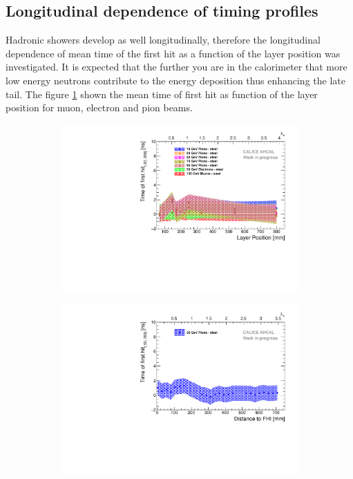 \subsection{Longitudinal dependence of timing profiles}

Hadronic showers develop as well longitudinally, therefore the longitudinal dependence of mean time of the first hit as a function of the layer position was investigated. It is expected that the further you are in the calorimeter that more low energy neutrons contribute to the energy deposition thus enhancing the late tail. The figure \ref{fig:Depth_Comparison} shown the mean time of first hit as function of the layer position for muon, electron and pion beams.

\begin{figure}[htbp!]
	\begin{subfigure}[t]{0.5\textwidth}
		\centering
		\includegraphics[width=1\textwidth]{../Thesis_Plots/Timing/Pions/Plots/Timing_Depth_Comparison_ShortAsymRange.pdf}
		\caption{} \label{fig:Depth_Comparison}
	\end{subfigure}
	\hfill
	\begin{subfigure}[t]{0.5\textwidth}
		\centering
		\includegraphics[width=1\textwidth]{../Thesis_Plots/Timing/Pions/Plots/Timing_Depth_Comparison_ShortAsymRange_ShowerStart.pdf}

\end{subfigure}
\end{figure}
